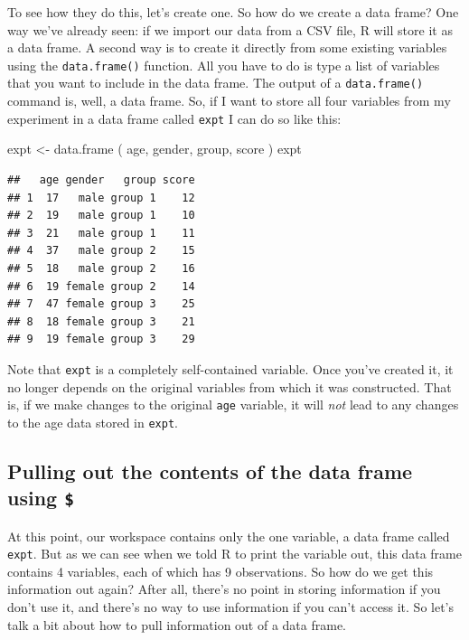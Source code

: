 \documentclass[
]{book}
\newenvironment{Shaded}{\begin{snugshade}}{\end{snugshade}}
\newcommand{\FunctionTok}[1]{\textcolor[rgb]{0.00,0.00,0.00}{#1}}
\newcommand{\NormalTok}[1]{#1}
\newcommand{\OtherTok}[1]{\textcolor[rgb]{0.56,0.35,0.01}{#1}}
\begin{document}
To see how they do this, let's create one. So how do we create a data frame? One way we've already seen: if we import our data from a CSV file, R will store it as a data frame. A second way is to create it directly from some existing variables using the \texttt{data.frame()} function. All you have to do is type a list of variables that you want to include in the data frame. The output of a \texttt{data.frame()} command is, well, a data frame. So, if I want to store all four variables from my experiment in a data frame called \texttt{expt} I can do so like this:

\begin{Shaded}
\begin{Highlighting}[]
\NormalTok{expt }\OtherTok{\textless{}{-}} \FunctionTok{data.frame}\NormalTok{ ( age, gender, group, score ) }
\NormalTok{expt }
\end{Highlighting}
\end{Shaded}

\begin{verbatim}
##   age gender   group score
## 1  17   male group 1    12
## 2  19   male group 1    10
## 3  21   male group 1    11
## 4  37   male group 2    15
## 5  18   male group 2    16
## 6  19 female group 2    14
## 7  47 female group 3    25
## 8  18 female group 3    21
## 9  19 female group 3    29
\end{verbatim}

Note that \texttt{expt} is a completely self-contained variable. Once you've created it, it no longer depends on the original variables from which it was constructed. That is, if we make changes to the original \texttt{age} variable, it will \emph{not} lead to any changes to the age data stored in \texttt{expt}.

\hypertarget{pulling-out-the-contents-of-the-data-frame-using}{%
\subsection{\texorpdfstring{Pulling out the contents of the data frame using \texttt{\$}}{Pulling out the contents of the data frame using \$}}\label{pulling-out-the-contents-of-the-data-frame-using}}

At this point, our workspace contains only the one variable, a data frame called \texttt{expt}. But as we can see when we told R to print the variable out, this data frame contains 4 variables, each of which has 9 observations. So how do we get this information out again? After all, there's no point in storing information if you don't use it, and there's no way to use information if you can't access it. So let's talk a bit about how to pull information out of a data frame.
\end{document}
